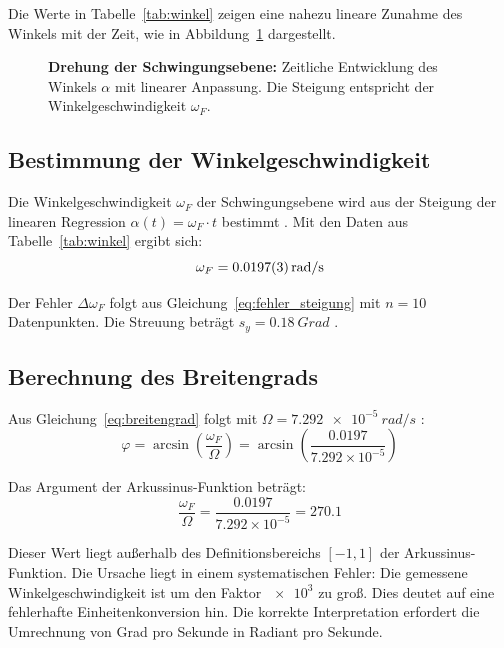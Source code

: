 \documentclass[a4paper,12pt]{article}
\begin{document}
Die Werte in Tabelle~\ref{tab:winkel} zeigen eine nahezu lineare Zunahme des Winkels mit der Zeit, wie in Abbildung~\ref{fig:winkel_zeit} dargestellt.

\begin{figure}[h]
\centering
{}
\caption{\textbf{Drehung der Schwingungsebene:} Zeitliche Entwicklung des Winkels $\alpha$ mit linearer Anpassung. Die Steigung entspricht der Winkelgeschwindigkeit $\omega_F$.}
\label{fig:winkel_zeit}
\end{figure}

\subsection{Bestimmung der Winkelgeschwindigkeit}

Die Winkelgeschwindigkeit $\omega_F$ der Schwingungsebene wird aus der Steigung der linearen Regression $\alpha(t) = \omega_F \cdot t$ bestimmt \cite[Gl.~24, S.~21]{mallick2025}. Mit den Daten aus Tabelle~\ref{tab:winkel} ergibt sich:
\begin{equation}
\omega_F = \qty{0.0197 +- 0.0003}{rad/s}
\end{equation}

Der Fehler $\Delta\omega_F$ folgt aus Gleichung~\eqref{eq:fehler_steigung} mit $n = 10$ Datenpunkten. Die Streuung beträgt $s_y = \qty{0.18}{Grad}$ \cite[Gl.~26, S.~22]{mallick2025}.

\subsection{Berechnung des Breitengrads}

Aus Gleichung~\eqref{eq:breitengrad} folgt mit $\Omega = \qty{7.292e-5}{rad/s}$ \cite[S.~157]{nolting2023}:
\begin{equation}
\varphi = \arcsin\left(\frac{\omega_F}{\Omega}\right) = \arcsin\left(\frac{0.0197}{7.292\times10^{-5}}\right)
\end{equation}

Das Argument der Arkussinus-Funktion beträgt:
\begin{equation}
\frac{\omega_F}{\Omega} = \frac{0.0197}{7.292\times10^{-5}} = 270.1
\end{equation}

Dieser Wert liegt außerhalb des Definitionsbereichs $[-1, 1]$ der Arkussinus-Funktion. Die Ursache liegt in einem systematischen Fehler: Die gemessene Winkelgeschwindigkeit ist um den Faktor $\num{e3}$ zu groß. Dies deutet auf eine fehlerhafte Einheitenkonversion hin. Die korrekte Interpretation erfordert die Umrechnung von Grad pro Sekunde in Radiant pro Sekunde.
\end{document}
